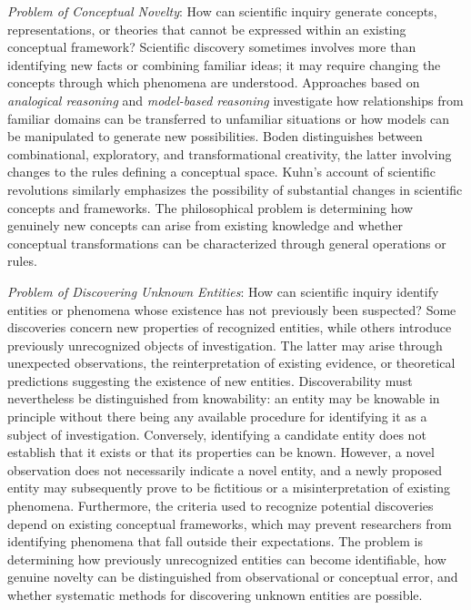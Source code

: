 \emph{Problem of Conceptual Novelty}: How can scientific inquiry generate concepts, representations, or theories that cannot be expressed within an existing conceptual framework? Scientific discovery sometimes involves more than identifying new facts or combining familiar ideas; it may require changing the concepts through which phenomena are understood. Approaches based on \emph{analogical reasoning} and \emph{model-based reasoning} investigate how relationships from familiar domains can be transferred to unfamiliar situations or how models can be manipulated to generate new possibilities. Boden distinguishes between combinational, exploratory, and transformational creativity, the latter involving changes to the rules defining a conceptual space. Kuhn's account of scientific revolutions similarly emphasizes the possibility of substantial changes in scientific concepts and frameworks. The philosophical problem is determining how genuinely new concepts can arise from existing knowledge and whether conceptual transformations can be characterized through general operations or rules.

\emph{Problem of Discovering Unknown Entities}: How can scientific inquiry identify entities or phenomena whose existence has not previously been suspected? Some discoveries concern new properties of recognized entities, while others introduce previously unrecognized objects of investigation. The latter may arise through unexpected observations, the reinterpretation of existing evidence, or theoretical predictions suggesting the existence of new entities. Discoverability must nevertheless be distinguished from knowability: an entity may be knowable in principle without there being any available procedure for identifying it as a subject of investigation. Conversely, identifying a candidate entity does not establish that it exists or that its properties can be known. However, a novel observation does not necessarily indicate a novel entity, and a newly proposed entity may subsequently prove to be fictitious or a misinterpretation of existing phenomena. Furthermore, the criteria used to recognize potential discoveries depend on existing conceptual frameworks, which may prevent researchers from identifying phenomena that fall outside their expectations. The problem is determining how previously unrecognized entities can become identifiable, how genuine novelty can be distinguished from observational or conceptual error, and whether systematic methods for discovering unknown entities are possible.

